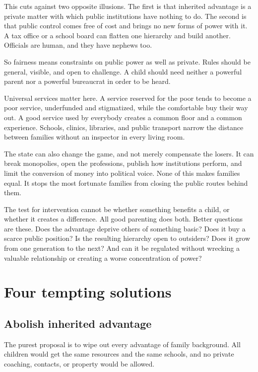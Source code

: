 \documentclass[12pt,a4paper]{book}
\begin{document}
This cuts against two opposite illusions. The first is that inherited advantage is a private matter with which public institutions have nothing to do. The second is that public control comes free of cost and brings no new forms of power with it. A tax office or a school board can flatten one hierarchy and build another. Officials are human, and they have nephews too.

So fairness means constraints on public power as well as private. Rules should be general, visible, and open to challenge. A child should need neither a powerful parent nor a powerful bureaucrat in order to be heard.

Universal services matter here. A service reserved for the poor tends to become a poor service, underfunded and stigmatized, while the comfortable buy their way out. A good service used by everybody creates a common floor and a common experience. Schools, clinics, libraries, and public transport narrow the distance between families without an inspector in every living room.

The state can also change the game, and not merely compensate the losers. It can break monopolies, open the professions, publish how institutions perform, and limit the conversion of money into political voice. None of this makes families equal. It stops the most fortunate families from closing the public routes behind them.

The test for intervention cannot be whether something benefits a child, or whether it creates a difference. All good parenting does both. Better questions are these. Does the advantage deprive others of something basic? Does it buy a scarce public position? Is the resulting hierarchy open to outsiders? Does it grow from one generation to the next? And can it be regulated without wrecking a valuable relationship or creating a worse concentration of power?

\section{Four tempting solutions}

\subsection{Abolish inherited advantage}

The purest proposal is to wipe out every advantage of family background. All children would get the same resources and the same schools, and no private coaching, contacts, or property would be allowed.
\end{document}
